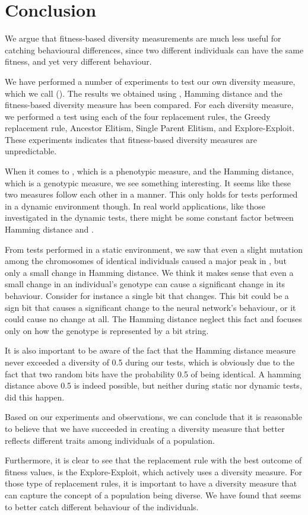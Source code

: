 \section{Conclusion}\label{sec:conclusion}
We argue that fitness-based diversity measurements are much less useful for catching behavioural differences, since two different individuals can have the same fitness, and yet very different behaviour.

We have performed a number of experiments to test our own diversity measure, which we call \di{} (\dia{}).
The results we obtained using \dia{}, Hamming distance and the fitness-based diversity measure has been compared.
For each diversity measure, we performed a test using each of the four replacement rules, the Greedy replacement rule, Ancestor Elitism, Single Parent Elitism, and Explore-Exploit.
These experiments indicates that fitness-based diversity measures are unpredictable.

When it comes to \dia{}, which is a phenotypic measure, and the Hamming distance, which is a genotypic measure, we see something interesting. It seems like these two measures follow each other in a manner. This only holds for tests performed in a dynamic environment though. 
In real world applications, like those investigated in the dynamic tests, there might be some constant factor between Hamming distance and \dia{}.

From tests performed in a static environment, we saw that even a slight mutation among the chromosomes of identical individuals caused a major peak in \dia{}, but only a small change in Hamming distance.
We think it makes sense that even a small change in an individual's genotype can cause a significant change in its behaviour. Consider for instance a single bit that changes. This bit could be a sign bit that causes a significant change to the neural network's behaviour, or it could cause no change at all. The Hamming distance neglect this fact and focuses only on how the genotype is represented by a bit string.

It is also important to be aware of the fact that the Hamming distance measure never exceeded a diversity of \num{0.5} during our tests, which is obviously due to the fact that two random bits have the probability \num{0.5} of being identical.
A hamming distance above \num{0.5} is indeed possible, but neither during static nor dynamic tests, did this happen. 

Based on our experiments and observations, we can conclude that it is reasonable to believe that we have succeeded in creating a diversity measure that better reflects different traits among individuals of a population.

Furthermore, it is clear to see that the replacement rule with the best outcome of fitness values, is the Explore-Exploit, which actively uses a diversity measure. For those type of replacement rules, it is important to have a diversity measure that can capture the concept of a population being diverse. We have found that \dia{} seems to better catch different behaviour of the individuals.